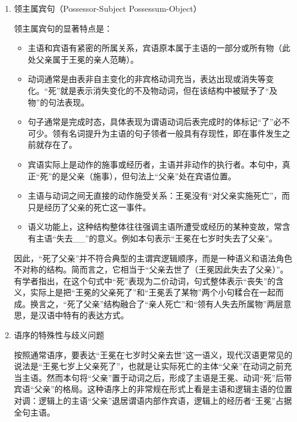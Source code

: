 \documentclass[10pt]{ctexart}
\begin{document}
\begin{enumerate}
    从句法上说，``死了父亲''仍可按主谓宾分析为：隐含主语（王冕）—谓语（死了）—宾语（父亲）。但这属于一种特殊的动宾结构，在这种结构中，动词本身语义上只涉及宾语（父亲去世），主语只是提供背景或领属关系。这种句子被称为``领主属宾句''，即主语与宾语存在领属（拥有/从属）关系：主语是领有人，宾语是主语所属的人或事物。在本例中，王冕与父亲是亲属（领属）关系。

    \item 领主属宾句（Possessor-Subject Possessum-Object）
    
    领主属宾句的显著特点是：
    \begin{itemize}
        \item 主语和宾语有紧密的所属关系，宾语原本属于主语的一部分或所有物（此处父亲属于王冕的亲人范畴）。
        \item 动词通常是由表非自主变化的非宾格动词充当，表达出现或消失等变化。``死''就是表示消失变化的不及物动词，但在该结构中被赋予了``及物''的句法表现。
        \item 句子通常是完成时态，具体表现为谓语动词后表完成时的体标记``了''必不可少。领有名词提升为主语的句子领者一般具有存现性，即在事件发生之前就存在了。
        \item 宾语实际上是动作的施事或经历者，主语并非动作的执行者。本句中，真正``死''的是父亲（施事），但句法上``父亲''处在宾语位置。
        \item 主语与动词之间无直接的动作施受关系：王冕没有``对父亲实施死亡''，而只是经历了父亲的死亡这一事件。
        \item 语义功能上，这种结构整体往往强调主语所遭受或经历的某种变故，常含有主语``失去\_\_''的意义。例如本句表示``王冕在七岁时失去了父亲''。
    \end{itemize}
	
    因此，``死了父亲''并不符合典型的主谓宾逻辑顺序，而是一种语义和语法角色不对称的结构。简而言之，它相当于``父亲去世了（王冕因此失去了父亲）''。有学者指出，在这个句式中``死''表现为二价动词，句式整体表示``丧失''的含义，实际上是把``王冕的父亲死了''和``王冕丢了某物''两个小句糅合在一起而成。换言之，``死了父亲''结构融合了``亲人死亡''和``领有人失去所属物''两层意思，是汉语中特有的表达方式。


    \item 语序的特殊性与歧义问题

    按照通常语序，要表达``王冕在七岁时父亲去世''这一语义，现代汉语更常见的说法是``王冕七岁上父亲死了''，也就是让实际死亡的主体``父亲''在动词之前充当主语。然而本句将``父亲''置于动词之后，形成了主语是王冕、动词``死''后带宾语``父亲''的格局。这种语序上的非常规在形式上看是主语和逻辑主语的位置对调：逻辑上的主语``父亲''退居谓语内部作宾语，逻辑上的经历者``王冕''占据全句主语。


\end{enumerate}
\end{document}
